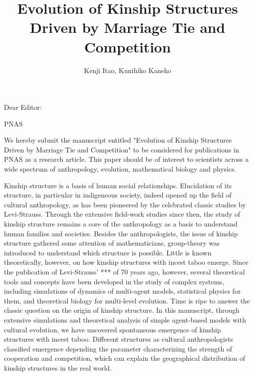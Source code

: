 \documentclass[a4j,12pt]{letter}
\title{Evolution of Kinship Structures Driven by Marriage Tie and Competition}
\author{Kenji Itao, Kunihiko Kaneko}
\begin{document}
Dear Editor:

PNAS

We hereby submit the manuscript entitled "Evolution of Kinship Structures Driven by Marriage Tie and Competition" to be considered for publications in PNAS as a research article.
This paper should be of interest to scientists across a wide spectrum of anthropology, evolution, mathematical biology and physics.

Kinship structure is a basis of human social relationships. Elucidation of its structure, in particular in indigeneous society, indeed opened up the field of cultural anthropology, as has been pioneered by the celebrated classic studies by Levi-Strauss.  Through the extensive field-work studies since then, the study of kinship structure remains a core of the anthropology as a basis to understand human families and societies. Besides the anthropologists, the issue of kinship structure gathered some attention of mathematicians, group-theory was introduced to understand which structure is possible.  Little is known theoretically, however, on how kinship structures with incest taboo emerge. Since the publication of Levi-Strauss’ *** of 70 years ago, however,  several theoretical tools and concepts have been developed in the study of complex systems, including simulations of dynamics of multi-agent models, statistical physics for them, and theoretical biology for multi-level evolution.  Time is ripe to answer the classic question on the origin of kinship structure.  In this manuscript, through extensive simulations and theoretical analysis of simple agent-based models with cultural evolution, we have uncovered spontaneous emergence of kinship structures with incest taboo. Different structures as cultural anthropologists classified emergence depending the parameter characterizing the strength of cooperation and competition, which can explain the geographical distribution of kinship structures in the real world.
\end{document}
